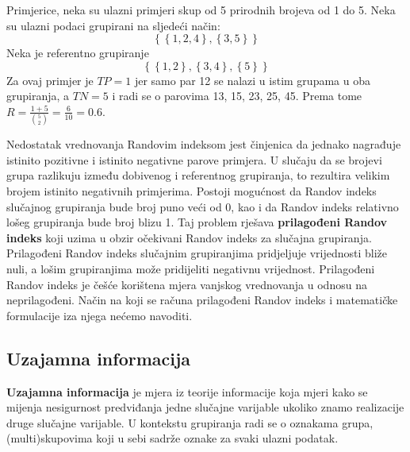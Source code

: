 \documentclass[times, utf8, zavrsni]{fer}
\begin{document}
Primjerice, neka su ulazni primjeri skup od 5 prirodnih brojeva od 1 do 5. Neka su ulazni podaci grupirani na sljedeći način:
\[\left\{ \left\{1, 2, 4\right\}, \left\{3, 5\right\} \right\}\]
Neka je referentno grupiranje
\[\left\{\left\{1,2\right\}, \left\{3,4\right\}, \left\{5\right\}\right\}\]
Za ovaj primjer je $TP = 1$ jer samo par 12 se nalazi u istim grupama u oba grupiranja, a $TN = 5$ i radi se o parovima 13, 15, 23, 25, 45. Prema tome $R = \frac{1 + 5}{\binom{5}{2}} = \frac{6}{10} = 0.6$.

Nedostatak vrednovanja Randovim indeksom jest činjenica da jednako nagrađuje istinito pozitivne i istinito negativne parove primjera. U slučaju da se brojevi grupa razlikuju između dobivenog i referentnog grupiranja, to rezultira velikim brojem istinito negativnih primjerima. Postoji mogućnost da Randov indeks slučajnog grupiranja bude broj puno veći od 0, kao i da Randov indeks relativno lošeg grupiranja bude broj blizu 1. Taj problem rješava \textbf{prilagođeni Randov indeks}  koji uzima u obzir očekivani Randov indeks za slučajna grupiranja. Prilagođeni Randov indeks slučajnim grupiranjima pridjeljuje vrijednosti bliže nuli, a lošim grupiranjima može pridijeliti negativnu vrijednost. Prilagođeni Randov indeks je češće korištena mjera vanjskog vrednovanja u odnosu na neprilagođeni. Način na koji se računa prilagođeni Randov indeks i matematičke formulacije iza njega nećemo navoditi.

\subsection{Uzajamna informacija}
\textbf{Uzajamna informacija}  je mjera iz teorije informacije koja mjeri kako se mijenja nesigurnost predviđanja jedne slučajne varijable ukoliko znamo realizacije druge slučajne varijable. U kontekstu grupiranja radi se o oznakama grupa, (multi)skupovima koji u sebi sadrže oznake za svaki ulazni podatak.
\end{document}
